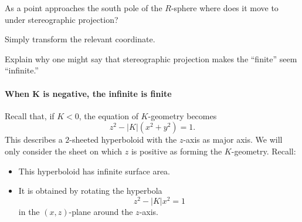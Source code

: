 \documentclass[newpage,hints,handout,12pt,noauthor,nooutcomes]{ximera}
\begin{document}
\begin{problem}
  As a point approaches the south pole of the $R$-sphere where does it
  move to under stereographic projection?
  \begin{hint}
    Simply transform the relevant coordinate.
  \end{hint}
  \begin{freeResponse}
  \end{freeResponse}
\end{problem}



\begin{problem}
  Explain why one might say that stereographic projection makes the
  ``finite'' seem ``infinite.''
    \begin{freeResponse}
    \end{freeResponse}
\end{problem}




\paragraph{When $\boldsymbol K$ is negative, the infinite is finite}


Recall that, if $K<0$, the equation of $K$-geometry becomes
\[
z^{2}-|K|(x^{2}+y^{2})=1.
\]
This describes a $2$-sheeted hyperboloid with the $z$-axis as major axis.  We
will only consider the sheet on which $z$ is positive as forming the
$K$-geometry.  Recall:

\begin{itemize}
\item This hyperboloid has infinite surface area.
\item It is obtained by rotating the hyperbola
  \[z^{2}-\left\vert K\right\vert x^{2}=1\]
  in the $(x,z)$-plane around the $z$-axis.
\end{itemize}
\end{document}

